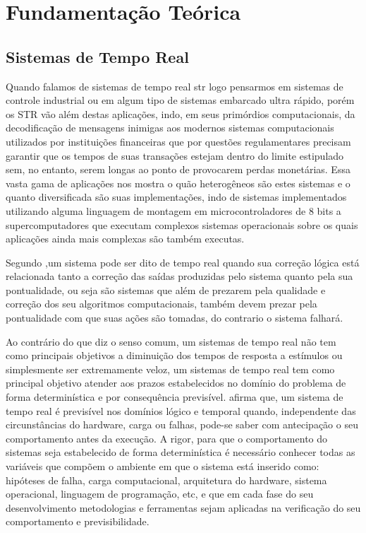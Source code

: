 \chapter{Fundamentação Teórica}
\label{cap:estadoarte}

\section{Sistemas de Tempo Real}
Quando falamos de sistemas de tempo real \gls{str} logo pensarmos em sistemas de controle industrial ou em algum tipo de sistemas embarcado ultra rápido, porém os STR vão além destas aplicações, indo, em seus primórdios computacionais, da decodificação de mensagens inimigas aos modernos sistemas computacionais utilizados por instituições financeiras que por questões regulamentares precisam garantir que os tempos de suas transações estejam dentro do limite estipulado sem, no entanto, serem longas ao ponto de provocarem perdas monetárias. Essa vasta gama de aplicações nos mostra o quão heterogêneos são estes sistemas e o quanto diversificada são suas implementações, indo de sistemas implementados utilizando alguma linguagem de montagem em microcontroladores de 8 bits a supercomputadores que executam complexos sistemas operacionais sobre os quais aplicações ainda mais complexas são também executas.
 
Segundo \cite{Laplante2012},um sistema pode ser dito de tempo real quando sua correção lógica está relacionada tanto a correção das saídas produzidas pelo sistema quanto pela sua pontualidade, ou seja são sistemas que além de prezarem pela qualidade e correção dos seu algoritmos computacionais, também devem prezar pela pontualidade com que suas ações são tomadas, do contrario o sistema falhará.

Ao contrário do que diz o senso comum, um sistemas de tempo real não tem como principais objetivos a diminuição dos tempos de resposta a estímulos ou simplesmente ser extremamente veloz, um sistemas de tempo real tem como principal objetivo atender aos prazos estabelecidos no domínio do problema de forma determinística e por consequência previsível.
\cite{Farines2000} afirma que, um sistema de tempo real é previsível nos domínios lógico e temporal quando, independente das circunstâncias do hardware, carga ou falhas, pode-se saber com antecipação o seu comportamento antes da execução. A rigor, para que o comportamento do sistemas seja estabelecido de forma determinística é necessário conhecer todas as variáveis que compõem o ambiente em que o sistema está inserido como: hipóteses de falha, carga computacional, arquitetura do hardware, sistema operacional, linguagem de programação, etc, e que em cada fase do seu desenvolvimento metodologias e ferramentas sejam aplicadas na verificação do seu comportamento e previsibilidade.


